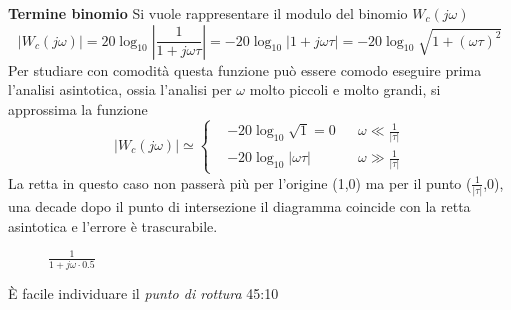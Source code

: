 \textbf{Termine binomio}
Si vuole rappresentare il modulo del binomio $W_c(j\omega)$
$$
|W_c(j\omega)| = 20\log_{10}\left|\frac{1}{1+j\omega\tau}\right| =
-20\log_{10}|1+j\omega \tau| = -20\log_{10}\sqrt{1+(\omega\tau)^2}
$$
Per studiare con comodità questa funzione può essere comodo eseguire prima
l'analisi asintotica, ossia l'analisi per $\omega$ molto piccoli e molto
grandi, si approssima la funzione
$$
|W_c(j\omega)| \simeq
\left\{\begin{aligned}
&-20\log_{10}\sqrt{1} = 0 &  & \omega \ll \frac{1}{|\tau|}\\
&-20\log_{10}|\omega\tau| &  & \omega \gg \frac{1}{|\tau|}
\end{aligned}\right.
$$
La retta in questo caso non passerà più per l'origine (1,0) ma per il punto
($\frac{1}{|\tau|}$,0), una decade dopo il punto di intersezione il diagramma
coincide con la retta asintotica e l'errore è trascurabile.
\begin{figure}[h]
\def\tau{0.5}
\centering
{}
\caption{$\frac{1}{1+j\omega\cdot\tau}$}
\end{figure}
È facile individuare il \textit{punto di rottura} 45:10
